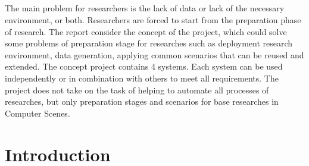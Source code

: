 \documentclass[twoside]{article}
\title{\vspace{-15mm}\fontsize{24pt}{10pt}\selectfont\textbf{\myArticleTitle}} %
\author{
\large
\textsc{\myAuthorName}\\
\normalsize \myUni \\ %
\normalsize \href{mailto:\myAuthorEmail}{\myAuthorEmail} %
\vspace{-10mm}
}
\date{}
\renewcommand{\abstractname}{} %
\renewenvironment{abstract}
 {\normalsize
  \begin{center}
  \end{center}
  \list{}{
    \setlength{\leftmargin}{.0cm}%
    \setlength{\rightmargin}{\leftmargin}%
  }%
  \item\relax}
 {\endlist}
\begin{document}
\large %

\maketitle %

\thispagestyle{fancy} %


\begin{abstract}

\noindent 
\large %
The main problem for researchers is the lack of data or lack of the necessary environment, or both.  Researchers are forced to start from the preparation phase of research. The report consider the concept of the project, which could solve some problems of preparation stage for researches such as deployment research environment, data generation, applying common scenarios that can be reused and extended. The concept project contains 4 systems. Each system can be used independently or in combination with others to meet all requirements. The project does not take on the task of helping to automate all processes of researches, but only preparation stages and scenarios for base researches in Computer Scenes.

\end{abstract}



\section{Introduction}
\end{document}
